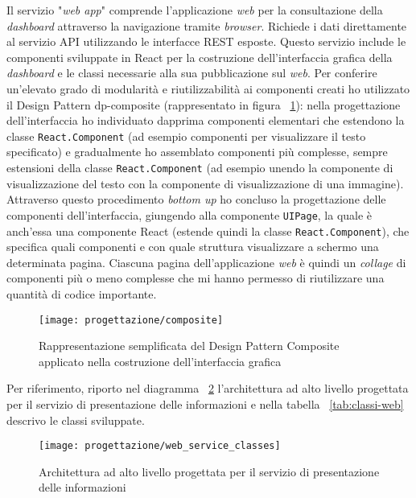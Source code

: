 
Il servizio "\emph{web app}" comprende l'applicazione \emph{web} per la consultazione della \emph{dashboard} attraverso la navigazione tramite \emph{browser}.
Richiede i dati direttamente al servizio API utilizzando le interfacce REST esposte.
Questo servizio include le componenti sviluppate in React per la costruzione dell'interfaccia grafica della \emph{dashboard} e le classi necessarie alla sua pubblicazione sul \emph{web}.
Per conferire un'elevato grado di modularità e riutilizzabilità ai componenti creati ho utilizzato il Design Pattern \gls{dp-composite} (rappresentato in figura ~\ref{fig:composite}): nella progettazione dell'interfaccia ho individuato dapprima componenti elementari che estendono la classe \texttt{React.Component} (ad esempio componenti per visualizzare il testo specificato) e gradualmente ho assemblato componenti più complesse, sempre estensioni della classe \texttt{React.Component} (ad esempio unendo la componente di visualizzazione del testo con la componente di visualizzazione di una immagine). Attraverso questo procedimento \emph{bottom up} ho concluso la progettazione delle componenti dell'interfaccia, giungendo alla componente \texttt{UIPage}, la quale è anch'essa una componente React (estende quindi la classe \texttt{React.Component}), che specifica quali componenti e con quale struttura visualizzare a schermo una determinata pagina. Ciascuna pagina dell'applicazione \emph{web} è quindi un \emph{collage} di componenti più o meno complesse che mi hanno permesso di riutilizzare una quantità di codice importante.

\begin{figure}[!h]
    \centering
    \texttt{[image: progettazione/composite]}
    \caption{Rappresentazione semplificata del Design Pattern Composite applicato nella costruzione dell'interfaccia grafica}
    \label{fig:composite}
\end{figure}

Per riferimento, riporto nel diagramma ~\ref{fig:classi-web} l'architettura ad alto livello progettata per il servizio di presentazione delle informazioni e nella tabella ~\ref{tab:classi-web} descrivo le classi sviluppate.

\begin{figure}[!h]
    \centering
    \texttt{[image: progettazione/web\_service\_classes]}
    \caption{Architettura ad alto livello progettata per il servizio di presentazione delle informazioni}
    \label{fig:classi-web}
\end{figure}

